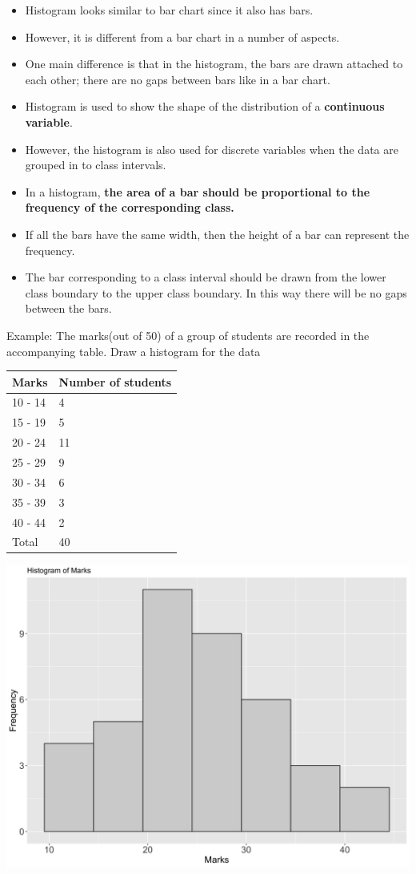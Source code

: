 \documentclass[]{book}
\providecommand{\tightlist}{%
  \setlength{\itemsep}{0pt}\setlength{\parskip}{0pt}}
\begin{document}
\begin{itemize}
\tightlist
\item
  Histogram looks similar to bar chart since it also has bars.
\item
  However, it is different from a bar chart in a number of aspects.
\item
  One main difference is that in the histogram, the bars are drawn attached to each other; there are no gaps between bars like in a bar chart.
\item
  Histogram is used to show the shape of the distribution of a \textbf{continuous variable}.
\item
  However, the histogram is also used for discrete variables when the data are grouped in to class intervals.
\item
  In a histogram, \textbf{the area of a bar should be proportional to the frequency of the corresponding class.}
\item
  If all the bars have the same width, then the height of a bar can represent the frequency.
\item
  The bar corresponding to a class interval should be drawn from the lower class boundary to the upper class boundary. In this way there will be no gaps between the bars.
\end{itemize}

Example: The marks(out of 50) of a group of students are recorded in the accompanying table. Draw a histogram for the data

\begin{longtable}[]{@{}ll@{}}
\toprule
Marks & Number of students\tabularnewline
\midrule
\endhead
10 - 14 & 4\tabularnewline
15 - 19 & 5\tabularnewline
20 - 24 & 11\tabularnewline
25 - 29 & 9\tabularnewline
30 - 34 & 6\tabularnewline
35 - 39 & 3\tabularnewline
40 - 44 & 2\tabularnewline
Total & 40\tabularnewline
\bottomrule
\end{longtable}

\begin{center}\includegraphics[width=0.8\linewidth]{figure/hist-1} \end{center}
\end{document}
